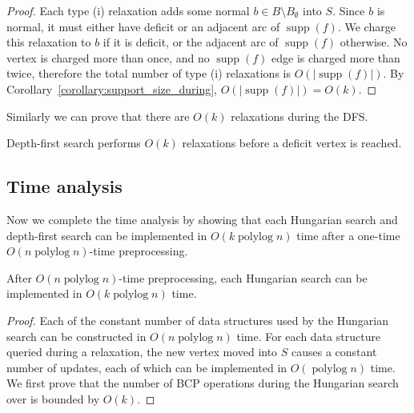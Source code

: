 \documentclass[a4paper,UKenglish]{socg-lipics-v2018}
\def\polylog{\mathop{\mathrm{polylog}}}
\def\supp{\operatorname{supp}}
\theoremstyle{plain}
\numberwithin{figure}{section}
\begin{document}
\begin{toappendix}
\begin{proof}
Each type (i) relaxation adds some normal $b \in B \setminus B_\emptyset$
into $S$.
Since $b$ is normal, it must either have deficit or an adjacent arc of
$\supp(f)$.
We charge this relaxation to $b$ if it is deficit, or the adjacent arc of
$\supp(f)$ otherwise.
No vertex is charged more than once, and no $\supp(f)$ edge is charged more
than twice, therefore the total number of type (i) relaxations is
$O(|\supp(f)|)$.
By Corollary~\ref{corollary:support_size_during}, $O(|\supp(f)|) = O(k)$.
\end{proof}

Similarly we can prove that there are $O(k)$ relaxations during the DFS.

\begin{corollary}
\label{corollary:goldberg_dfs_length}
Depth-first search performs $O(k)$ relaxations before a deficit vertex is reached.
\end{corollary}



\subsection{Time analysis}
\label{SSA:time-ananlsis}

Now we complete the time analysis
by showing that each Hungarian search and depth-first search can be implemented in $O(k \polylog n)$ time after a one-time $O(n \polylog n)$-time preprocessing.

\begin{lemmarep}
\label{lemma:goldberg_hs_time}
After $O(n \polylog n)$-time preprocessing,
each Hungarian search can be implemented in $O(k \polylog n)$ time.
\end{lemmarep}
%
\begin{proof}
Each of the constant number of data structures used by the Hungarian search can be constructed in $O(n\polylog n)$ time.
For each data structure queried during a relaxation,
the new vertex moved into $S$ causes a constant number of updates, each of which can be implemented in $O(\polylog n)$ time.
%
We first prove that the number of BCP
operations during the Hungarian search over %
is bounded by $O(k)$.


\end{proof}
\end{toappendix}
\end{document}
